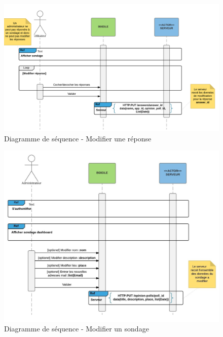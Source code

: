 \documentclass[titlepage]{report}
\begin{document}
\begin{figure}[h]
	\caption{Diagramme de séquence - Modifier une réponse}
	\label{annexe_diagramme_sequence_modifierReponse}
	\centering
	\includegraphics[width=\textwidth]{figures/diagrammes/sequence_modifierReponse.png}
\end{figure}

\begin{figure}[h]
	\caption{Diagramme de séquence - Modifier un sondage}
	\label{annexe_diagramme_modifierSondage}
	\centering
	\includegraphics[width=\textwidth]{figures/diagrammes/sequence_modifierSondage.png}
\end{figure}
\end{document}
